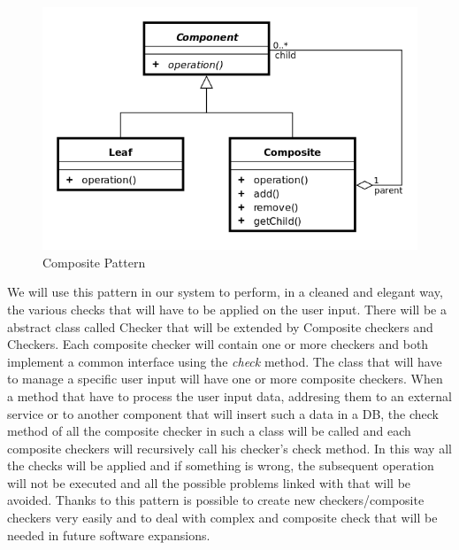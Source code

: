 \begin{figure}[H]
	\centering
	\includegraphics[scale=0.35]{Images/Patterns/Composite_Pattern}
	\caption{Composite Pattern}
\end{figure}
We will use this pattern in our system to perform, in a cleaned and elegant way, the various checks that will have to be applied on the user input. There will be a abstract class called Checker that will be extended by Composite checkers and Checkers. Each composite checker will contain one or more checkers and both implement a common interface using the \emph{check} method. The class that will have to manage a specific user input will have one or more composite checkers.
When a method that have to process the user input data, addresing them to an external service or to another component that will insert such a data in a DB, the check method of all the composite checker in such a class will be called and each composite checkers will recursively call his checker’s check method. In this way all the checks will be applied and if something is wrong, the subsequent operation will not be executed and all the possible problems linked with that will be avoided. 
Thanks to this pattern is possible to create new checkers/composite checkers very easily and to deal with complex and composite check that will be needed in future software expansions.

